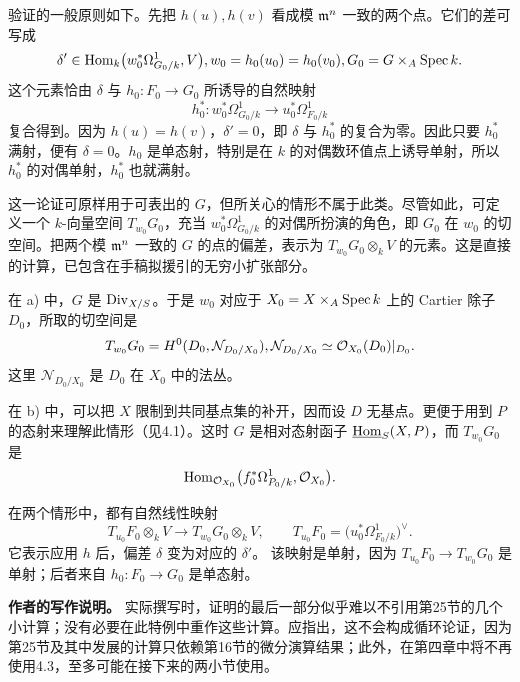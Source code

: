 验证的一般原则如下。先把 \(h(u),h(v)\) 看成模 \(\mathfrak m^n\) 一致的两个点。它们的差可写成
\[
 \delta'\in\operatorname{Hom}_k\bigl(w_0^*\Omega^1_{G_0/k},V\bigr),
  w_0=h_0(u_0)=h_0(v_0), G_0=G\times_A\operatorname{Spec} k.
\]
这个元素恰由 \(\delta\) 与 \(h_0:F_0\to G_0\) 所诱导的自然映射
\[
 h_0^*:w_0^*\Omega^1_{G_0/k}\longrightarrow u_0^*\Omega^1_{F_0/k}
\]
复合得到。因为 \(h(u)=h(v)\)，\(\delta'=0\)，即 \(\delta\) 与 \(h_0^*\) 的复合为零。因此只要 \(h_0^*\) 满射，便有 \(\delta=0\)。\(h_0\) 是单态射，特别是在 \(k\) 的对偶数环值点上诱导单射，所以 \(h_0^*\) 的对偶单射，\(h_0^*\) 也就满射。

这一论证可原样用于可表出的 \(G\)，但所关心的情形不属于此类。尽管如此，可定义一个 \(k\)-向量空间 \(T_{w_0}G_0\)，充当 \(w_0^*\Omega^1_{G_0/k}\) 的对偶所扮演的角色，即 \(G_0\) 在 \(w_0\) 的切空间。把两个模 \(\mathfrak m^n\) 一致的 \(G\) 的点的偏差，表示为 \(T_{w_0}G_0\otimes_kV\) 的元素。这是直接的计算，已包含在手稿拟援引的无穷小扩张部分。

在 a) 中，\(G\) 是 \(\operatorname{Div}_{X/S}\)。于是 \(w_0\) 对应于 \(X_0=X\times_A\operatorname{Spec} k\) 上的 Cartier 除子 \(D_0\)，所取的切空间是
\[
 T_{w_0}G_0=H^0(D_0,\mathcal N_{D_0/X_0}),
 \qquad
 \mathcal N_{D_0/X_0}\simeq\OO_{X_0}(D_0)|_{D_0}.
\]
这里 \(\mathcal N_{D_0/X_0}\) 是 \(D_0\) 在 \(X_0\) 中的法丛。

在 b) 中，可以把 \(X\) 限制到共同基点集的补开，因而设 \(D\) 无基点。更便于用到 \(P\) 的态射来理解此情形（见4.1）。这时 \(G\) 是相对态射函子 \(\underline{\operatorname{Hom}}_S(X,P)\)，而 \(T_{w_0}G_0\) 是
\[
 \operatorname{Hom}_{\mathcal O_{X_0}}\bigl(f_0^*\Omega^1_{P_0/k},\mathcal O_{X_0}\bigr).
\]


在两个情形中，都有自然线性映射
\[
 T_{u_0}F_0\otimes_kV\longrightarrow T_{w_0}G_0\otimes_kV,
 \qquad T_{u_0}F_0=\bigl(u_0^*\Omega^1_{F_0/k}\bigr)^\vee .
\]
它表示应用 \(h\) 后，偏差 \(\delta\) 变为对应的 \(\delta'\)。
该映射是单射，因为 \(T_{u_0}F_0\to T_{w_0}G_0\) 是单射；后者来自 \(h_0:F_0\to G_0\) 是单态射。

\medskip\noindent\textbf{作者的写作说明。}
实际撰写时，证明的最后一部分似乎难以不引用第25节的几个小计算；没有必要在此特例中重作这些计算。应指出，这不会构成循环论证，因为第25节及其中发展的计算只依赖第16节的微分演算结果；此外，在第四章中将不再使用4.3，至多可能在接下来的两小节使用。


